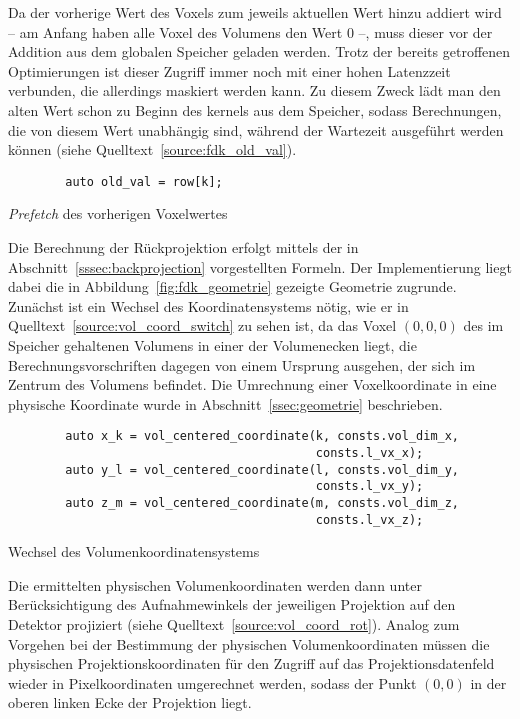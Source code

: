 Da der vorherige Wert des Voxels zum jeweils aktuellen Wert hinzu addiert wird -- am Anfang haben alle Voxel des
Volumens den Wert 0 --, muss dieser vor der Addition aus dem globalen Speicher geladen werden. Trotz der bereits
getroffenen Optimierungen ist dieser Zugriff immer noch mit einer hohen Latenzzeit verbunden, die allerdings maskiert
werden kann. Zu diesem Zweck lädt man den alten Wert schon zu Beginn des \gls{kernel}s aus dem Speicher, sodass
Berechnungen, die von diesem Wert unabhängig sind, während der Wartezeit ausgeführt werden können (siehe
Quelltext~\ref{source:fdk_old_val}).

\begin{code}
\begin{verbatim}
        auto old_val = row[k];
\end{verbatim}
\caption{\textit{Prefetch} des vorherigen Voxelwertes}
\label{source:fdk_old_val}
\end{code}

Die Berechnung der Rückprojektion erfolgt mittels der in Abschnitt~\ref{sssec:backprojection} vorgestellten Formeln. Der
Implementierung liegt dabei die in Abbildung~\ref{fig:fdk_geometrie} gezeigte Geometrie zugrunde. Zunächst ist ein
Wechsel des Koordinatensystems nötig, wie er in Quelltext~\ref{source:vol_coord_switch} zu sehen ist, da das Voxel
$(0, 0, 0)$ des im Speicher gehaltenen Volumens in einer der Volumenecken liegt, die Berechnungsvorschriften dagegen von
einem Ursprung ausgehen, der sich im Zentrum des Volumens befindet. Die Umrechnung einer Voxelkoordinate in eine
physische Koordinate wurde in Abschnitt~\ref{ssec:geometrie} beschrieben.

\begin{code}
\begin{verbatim}
        auto x_k = vol_centered_coordinate(k, consts.vol_dim_x,
                                           consts.l_vx_x);
        auto y_l = vol_centered_coordinate(l, consts.vol_dim_y,
                                           consts.l_vx_y);
        auto z_m = vol_centered_coordinate(m, consts.vol_dim_z,
                                           consts.l_vx_z);
\end{verbatim}
\caption{Wechsel des Volumenkoordinatensystems}
\label{source:vol_coord_switch}
\end{code}

Die ermittelten physischen Volumenkoordinaten werden dann unter Berücksichtigung des Aufnahmewinkels der jeweiligen
Projektion auf den Detektor projiziert (siehe Quelltext~\ref{source:vol_coord_rot}). Analog zum Vorgehen bei der
Bestimmung der physischen Volumenkoordinaten müssen die physischen Projektionskoordinaten für den Zugriff auf das
Projektionsdatenfeld wieder in Pixelkoordinaten umgerechnet werden, sodass der Punkt $(0, 0)$ in der oberen linken Ecke
der Projektion liegt.

